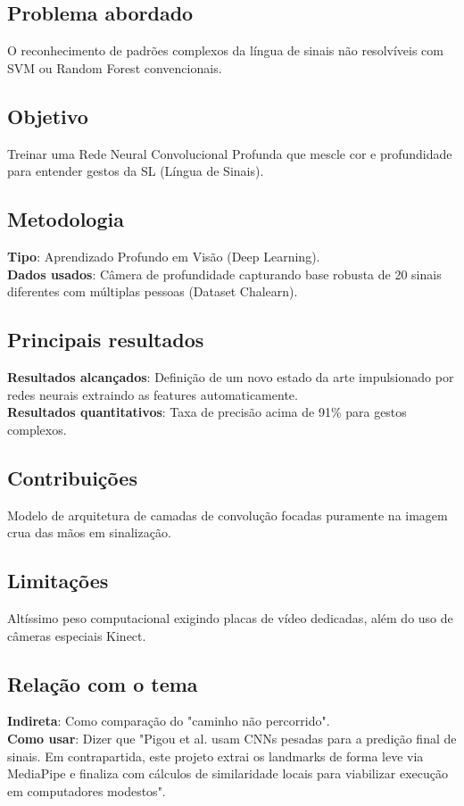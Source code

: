 \documentclass[12pt, a4paper]{article}
\begin{document}
\subsection{Problema abordado}
O reconhecimento de padrões complexos da língua de sinais não resolvíveis com SVM ou Random Forest convencionais.\\
\subsection{Objetivo}
Treinar uma Rede Neural Convolucional Profunda que mescle cor e profundidade para entender gestos da SL (Língua de Sinais).\\
\subsection{Metodologia}
\textbf{Tipo}: Aprendizado Profundo em Visão (Deep Learning).\\
\textbf{Dados usados}: Câmera de profundidade capturando base robusta de 20 sinais diferentes com múltiplas pessoas (Dataset Chalearn).\\
\subsection{Principais resultados}
\textbf{Resultados alcançados}: Definição de um novo estado da arte impulsionado por redes neurais extraindo as features automaticamente.\\
\textbf{Resultados quantitativos}: Taxa de precisão acima de 91\% para gestos complexos.\\
\subsection{Contribuições}
Modelo de arquitetura de camadas de convolução focadas puramente na imagem crua das mãos em sinalização.\\
\subsection{Limitações}
Altíssimo peso computacional exigindo placas de vídeo dedicadas, além do uso de câmeras especiais Kinect.\\
\subsection{Relação com o tema}
\textbf{Indireta}: Como comparação do "caminho não percorrido".\\
\textbf{Como usar}: Dizer que "Pigou et al. usam CNNs pesadas para a predição final de sinais. Em contrapartida, este projeto extrai os landmarks de forma leve via MediaPipe e finaliza com cálculos de similaridade locais para viabilizar execução em computadores modestos".\\
\end{document}
